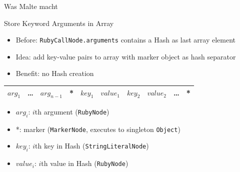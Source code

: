 \documentclass[xcolor=dvipsname,handout]{beamer} %
\begin{document}
\begin{frame}{Was Malte macht}

\end{frame}

\begin{frame}{Store Keyword Arguments in Array}
\begin{itemize}
    \item Before: \lstinline{RubyCallNode.arguments} contains a Hash as last array element
    \item Idea: add key-value pairs to array with marker object as hash separator
    \item Benefit: no Hash creation
\end{itemize}

\begin{table}
\begin{tabular}{|c|c|c|c|c|c|c|c|c|c|}
\hline
$\mathit{arg}_1$ & \ldots & $\mathit{arg}_{n-1}$ & * & $\mathit{key}_1$ & $\mathit{value}_1$ & $\mathit{key}_2$ & $\mathit{value}_2$ & \ldots & * \\
\hline
\end{tabular}
\end{table}
\begin{itemize}
    \item $\mathit{arg}_i$: $i$th argument (\lstinline{RubyNode})
    \item *: marker (\lstinline{MarkerNode}, executes to singleton \lstinline{Object})
    \item $\mathit{key}_i$: $i$th key in Hash (\lstinline{StringLiteralNode})
    \item $\mathit{value}_i$: $i$th value in Hash (\lstinline{RubyNode})
\end{itemize}
\end{frame}
\end{document}
